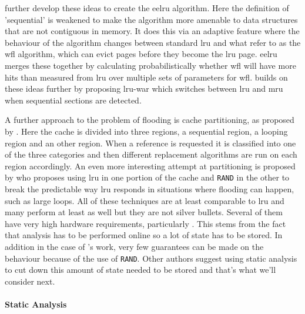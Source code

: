 \citet{smaragdakisEELRUSimpleEffective1999} further develop these ideas to create the \gls{eelru} algorithm. Here the definition of 'sequential' is weakened to make the algorithm more amenable to data structures that are not contiguous in memory. It does this via an adaptive feature where the behaviour of the algorithm changes between standard \gls{lru} and what \citeauthor{smaragdakisEELRUSimpleEffective1999} refer to as the \gls{wfl} algorithm, which can evict pages before they become the \gls{lru} page. \gls{eelru} merges these together by calculating probabilistically whether \gls{wfl} will have more hits than measured from \gls{lru} over multiple sets of parameters for \gls{wfl}. \citet{midorikawaAdaptiveReplacementBased2008} builds on these ideas further by proposing \gls{lru-war} which switches between \gls{lru} and \gls{mru} when sequential sections are detected.

A further approach to the problem of flooding is cache partitioning, as proposed by \citeauthor{kimLowoverheadHighperformanceUnified2000}. Here the cache is divided into three regions, a sequential region, a looping region and an other region. When a reference is requested it is classified into one of the three categories and then different replacement algorithms are run on each region accordingly. An even more interesting attempt at partitioning is proposed by \citet{dasRandomLRUReplacementPolicy2013a} who proposes using \gls{lru} in one portion of the cache and \texttt{RAND} in the other to break the predictable way \gls{lru} responds in situations where flooding can happen, such as large loops. All of these techniques are at least comparable to \gls{lru} and many perform at least as well but they are not silver bullets. Several of them have very high hardware requirements, particularly \citet{kimLowoverheadHighperformanceUnified2000}. This stems from the fact that analysis has to be performed online so a lot of state has to be stored. In addition in the case of \citeauthor{dasRandomLRUReplacementPolicy2013a}'s work, very few guarantees can be made on the behaviour because of the use of \texttt{RAND}. Other authors suggest using static analysis to cut down this amount of state needed to be stored and that's what we'll consider next.

\paragraph{Static Analysis}

